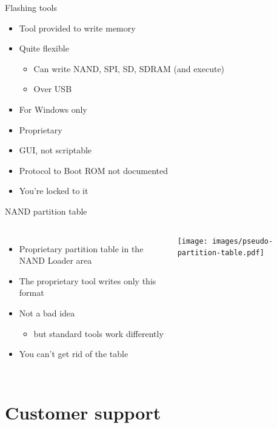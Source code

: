 \documentclass[xetex,table]{beamer}
\begin{document}
\begin{frame}{Flashing tools}
  \begin{itemize}
  \item Tool provided to write memory
  \item Quite flexible
    \begin{itemize}
    \item Can write NAND, SPI, SD, SDRAM (and execute)
    \item Over USB
    \end{itemize}
  \item For Windows only
  \item Proprietary
  \item GUI, not scriptable
  \item Protocol to Boot ROM not documented
  \item[\textrightarrow] You're locked to it
  \end{itemize}
\end{frame}

\begin{frame}{NAND partition table}
  \begin{columns}
    \begin{itemize}
    \item Proprietary partition table in the NAND Loader area
    \item The proprietary tool writes only this format
    \item Not a bad idea
      \begin{itemize}
        \item but standard tools work differently
    \end{itemize}
    \item[\textrightarrow] You can't get rid of the table
    \end{itemize}
    \texttt{[image: images/pseudo-partition-table.pdf]}
  \end{columns}
\end{frame}

\section{Customer support}
\end{document}
